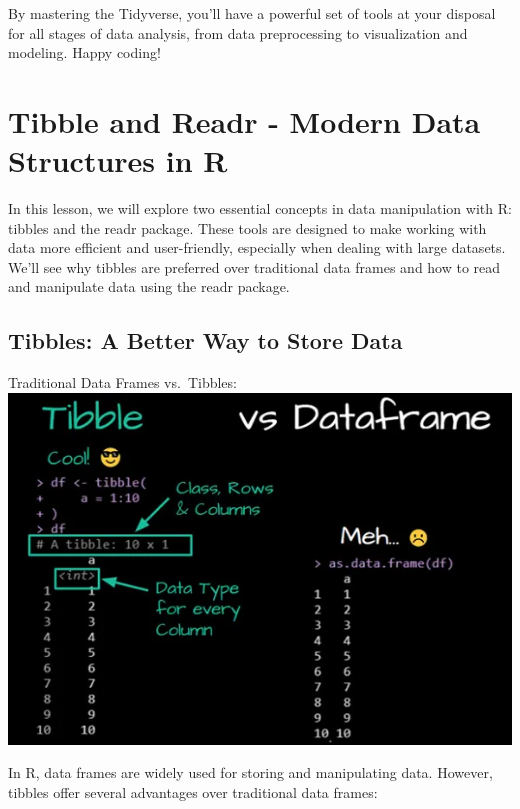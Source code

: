 \documentclass[
]{book}
\begin{document}
By mastering the Tidyverse, you'll have a powerful set of tools at your disposal for all stages of data analysis, from data preprocessing to visualization and modeling. Happy coding!

\hypertarget{tibble-and-readr---modern-data-structures-in-r}{%
\section{Tibble and Readr - Modern Data Structures in R}\label{tibble-and-readr---modern-data-structures-in-r}}

In this lesson, we will explore two essential concepts in data manipulation with R: tibbles and the readr package. These tools are designed to make working with data more efficient and user-friendly, especially when dealing with large datasets. We'll see why tibbles are preferred over traditional data frames and how to read and manipulate data using the readr package.

\hypertarget{tibbles-a-better-way-to-store-data}{%
\subsection{Tibbles: A Better Way to Store Data}\label{tibbles-a-better-way-to-store-data}}

Traditional Data Frames vs.~Tibbles:
\includegraphics{images/tibble.png}

In R, data frames are widely used for storing and manipulating data. However, tibbles offer several advantages over traditional data frames:
\end{document}
